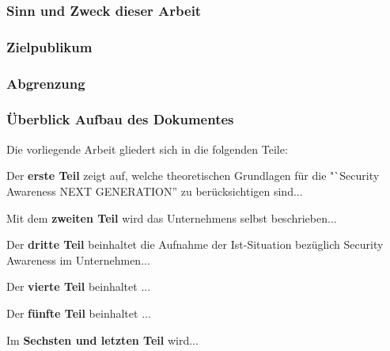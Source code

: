 \documentclass[../../main.tex]{subfiles}
\begin{document}

\subsubsection*{Sinn und Zweck dieser Arbeit}

\subsubsection*{Zielpublikum}

\subsubsection*{Abgrenzung}

\subsubsection*{Überblick Aufbau des Dokumentes}

Die vorliegende Arbeit gliedert sich in die folgenden Teile:

\begin{sloppypar}
Der \textbf{erste Teil} zeigt auf, welche theoretischen Grundlagen für die "`Security Awareness NEXT GENERATION'' zu berücksichtigen sind...
\end{sloppypar}

\begin{sloppypar}
Mit dem \textbf{zweiten Teil} wird das Unternehmens selbst beschrieben...
\end{sloppypar}

\begin{sloppypar}
Der \textbf{dritte Teil} beinhaltet die Aufnahme der Ist-Situation bezüglich Security Awareness im Unternehmen...
\end{sloppypar}

\begin{sloppypar}
Der \textbf{vierte Teil} beinhaltet ...
\end{sloppypar}

\begin{sloppypar}
Der \textbf{fünfte Teil} beinhaltet ...
\end{sloppypar}


\begin{sloppypar}
Im \textbf{Sechsten und letzten Teil} wird...

\end{sloppypar}
\end{document}
